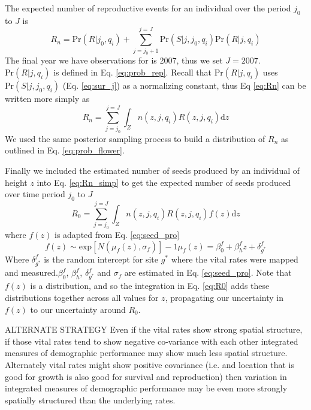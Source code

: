 \documentclass[12pt,a4paper]{article}
\begin{document}
The expected number of reproductive events for an individual over the period $j_0$ to $J$ is
\begin{equation}\label{eq:Rn}
	R_n = \text{Pr}(R|j_0, q_i) + \sum_{j = j_0 + 1}^{j = J} \text{Pr}(S|j, j_0, q_i)\text{Pr}(R|j, q_i)
\end{equation}    
The final year we have observations for is 2007, thus we set $J = 2007$. $\text{Pr}(R|j, q_i)$ is defined in Eq. \ref{eq:prob_rep}. Recall that $\text{Pr}(R|j, q_i)$ uses $\text{Pr}(S|j, j_0, q_i)$ (Eq. \ref{eq:sur_j}) as a normalizing constant, thus Eq \ref{eq:Rn} can be written more simply as 
\begin{equation}\label{eq:Rn_simp}
	R_n = \sum_{j = j_0}^{j = J} \int_Z n(z, j, q_i)R(z, j, q_i)\text{d}z
\end{equation}
We used the same posterior sampling process to build a distribution of $R_n$ as outlined in Eq. \ref{eq:prob_flower}.

Finally we included the estimated number of seeds produced by an individual of height $z$ into Eq. \ref{eq:Rn_simp} to get the expected number of seeds produced over time period $j_0$ to $J$
\begin{equation}\label{eq:R0}
	R_0 = \sum_{j = j_0}^{j = J} \int_Z n(z, j, q_i)R(z, j, q_i)f(z)\text{d}z
\end{equation}
where $f(z)$ is adapted from Eq. \ref{eq:seed_pro}
\begin{subequations}
\begin{equation}
	f(z) \sim \text{exp}[N(\mu_f(z), \sigma_f)] - 1
\end{equation}
\begin{equation}
	\mu_f(z) = \beta_0^f + \beta_h^f z + \delta_{g^*}^f
\end{equation}      
\end{subequations}
Where $\delta_{g^*}^f$ is the random intercept for site $g^*$ where the vital rates were mapped and measured.$\beta_0^f$, $\beta_h^f$,  $\delta_{g^*}^f$ and $\sigma_f$ are estimated in Eq. \ref{eq:seed_pro}. Note that $f(z)$ is a distribution, and so the integration in Eq. \ref{eq:R0} adds these distributions together across all values for $z$, propagating our uncertainty in $f(z)$ to our uncertainty around $R_0$.        


ALTERNATE STRATEGY
Even if the vital rates show strong spatial structure, if those vital rates tend to show negative co-variance with each other integrated measures of demographic performance may show much less spatial structure. Alternately vital rates might show positive covariance (i.e. and location that is good for growth is also good for survival and reproduction) then variation in integrated measures of demographic performance may be even more strongly spatially structured than the underlying rates. 
\end{document}
